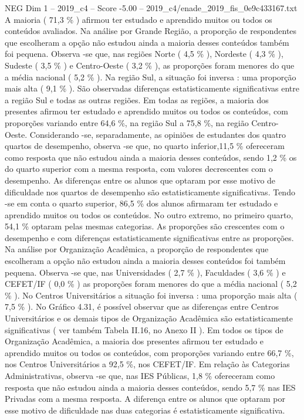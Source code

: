 \begin{textsample}{NEG Dim 1 – 2019\_c4 – Score -5.00 – 2019\_c4/enade\_2019\_fis\_0e9c433167.txt}
A maioria ( 71,3 \% ) afirmou ter estudado e aprendido muitos ou todos os conteúdos avaliados.
Na análise por Grande Região, a proporção de respondentes que escolheram a opção não estudou ainda a maioria desses conteúdos também foi pequena.
Observa -se que, nas regiões Norte ( 4,5 \% ), Nordeste ( 4,3 \% ), Sudeste ( 3,5 \% ) e Centro-Oeste ( 3,2 \% ), as proporções foram menores do que a média nacional ( 5,2 \% ).
Na região Sul, a situação foi inversa : uma proporção mais alta ( 9,1 \% ).
São observadas diferenças estatisticamente significativas entre a região Sul e todas as outras regiões.
Em todas as regiões, a maioria dos presentes afirmou ter estudado e aprendido muitos ou todos os conteúdos, com proporções variando entre 64,6 \%, na região Sul a 75,8 \%, na região Centro-Oeste.
Considerando -se, separadamente, as opiniões de estudantes dos quatro quartos de desempenho, observa -se que, no quarto inferior,11,5 \% ofereceram como resposta que não estudou ainda a maioria desses conteúdos, sendo 1,2 \% os do quarto superior com a mesma resposta, com valores decrescentes com o desempenho.
As diferenças entre os alunos que optaram por esse motivo de dificuldade nos quartos de desempenho são estatisticamente significativas.
Tendo -se em conta o quarto superior, 86,5 \% dos alunos afirmaram ter estudado e aprendido muitos ou todos os conteúdos.
No outro extremo, no primeiro quarto, 54,1 \% optaram pelas mesmas categorias.
As proporções são crescentes com o desempenho e com diferenças estatisticamente significativas entre as proporções.
Na análise por Organização Acadêmica, a proporção de respondentes que escolheram a opção não estudou ainda a maioria desses conteúdos foi também pequena.
Observa -se que, nas Universidades ( 2,7 \% ), Faculdades ( 3,6 \% ) e CEFET/IF ( 0,0 \% ) as proporções foram menores do que a média nacional ( 5,2 \% ).
No Centros Universitários a situação foi inversa : uma proporção mais alta ( 7,5 \% ).
No Gráfico 4.31, é possível observar que as diferenças entre Centros Universitários e os demais tipos de Organização Acadêmica são estatisticamente significativas ( ver também Tabela II.16, no Anexo II ).
Em todos os tipos de Organização Acadêmica, a maioria dos presentes afirmou ter estudado e aprendido muitos ou todos os conteúdos, com proporções variando entre 66,7 \%, nos Centros Universitários a 92,5 \%, nos CEFET/IF.
Em relação às Categorias Administrativas, observa -se que, nas IES Públicas, 1,8 \% ofereceram como resposta que não estudou ainda a maioria desses conteúdos, sendo 5,7 \% nas IES Privadas com a mesma resposta.
A diferença entre os alunos que optaram por esse motivo de dificuldade nas duas categorias é estatisticamente significativa.

\end{textsample}

